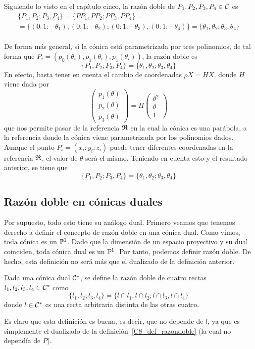 Siguiendo lo visto en el capítulo cinco, la razón doble de $P_1,P_2,P_3,P_4\in\mathcal{C}$ es
\begin{multline}
	\{P_1,P_2;P_3,P_4\}=\{PP_1,PP_2;PP_3,PP_4\}=\\=\{(0:1:-\theta_1),(0:1:-\theta_2);(0:1:-\theta_3),(0:1:-\theta_4)\}=\{\theta_1,\theta_2;\theta_3,\theta_4\}
\end{multline}\\
De forma más general, si la cónica está parametrizada por tres polinomios, de tal forma que $P_i=(p_0(\theta_i),p_1(\theta_i),p_1(\theta_i))$, la razón doble es
\begin{equation}
\{P_1,P_2;P_3,P_4\}=\{\theta_1,\theta_2;\theta_3,\theta_4\}
\end{equation}
En efecto, basta tener en cuenta el cambio de coordenadas $\rho\overline{X}=HX$, donde $H$ viene dada por 
\begin{equation*}
	\left( \begin{array}{c}
	p_1(\theta)\\p_2(\theta)\\p_3(\theta)
	\end{array}\right)=H
	\left( \begin{array}{c}
	\theta^2\\\theta\\1
	\end{array}\right)
\end{equation*}
que nos permite pasar de la referencia $\mathfrak{R}$ en la cual la cónica es una parábola, a la referencia donde la cónica viene parametrizada por los polinomios dados. Aunque el punto $P_i=(x_i:y_i:z_i)$ puede tener diferentes coordenadas en la referencia $\mathfrak{R}$, el valor de $\theta$ será el mismo. Teniendo en cuenta esto y el resultado anterior, se tiene que
\begin{equation*}
	\{P_1,P_2;P_3,P_4\}=\{\theta_1,\theta_2;\theta_3,\theta_4\}
\end{equation*}

\subsection{Razón doble en cónicas duales}
Por supuesto, todo esto tiene su análogo dual. Primero veamos que tenemos derecho a definir el concepto de razón doble en una cónica dual. Como vimos, toda cónica es un $\mathbb{P}^1$. Dado que la dimensión de un espacio proyectivo y su dual coinciden, toda cónica dual es un $\mathbb{P}^1$. Por tanto, podemos definir razón doble. De hecho, esta definición no será más que el dualizado de la definición anterior.
\begin{defi}
	Dada una cónica dual $\mathcal{C}^*$, se define la razón doble de cuatro rectas $l_1,l_2,l_3,l_4\in\mathcal{C}^*$ como
	\begin{equation}
		\{l_1,l_2;l_3,l_4\}=\{l\cap l_1,l\cap l_2;l\cap l_3,l\cap l_4\}
	\end{equation}
	donde $l\in\mathcal{C}^*$ es una recta arbitraria distinta de las otras cuatro.
\end{defi}
Es claro que esta definición es buena, es decir, que no depende de $l$, ya que es simplemente el dualizado de la definición~\ref{C8_def_razondoble} (la cual no dependía de $P$).

